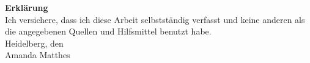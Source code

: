 \documentclass[12pt,a4paper]{article}
\begin{document}
\newpage
\thispagestyle{empty}

\textbf{Erklärung}\\

Ich versichere, dass ich diese Arbeit selbstständig verfasst und keine anderen als die angegebenen Quellen und Hilfsmittel benutzt habe.\\

Heidelberg, den \\ %

\vspace{2cm}
Amanda Matthes
\end{document}
